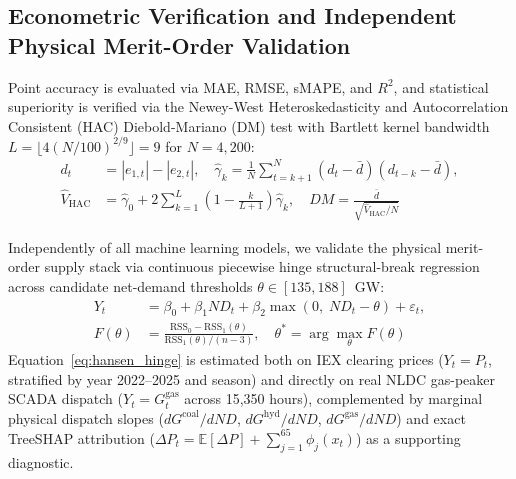 \documentclass[journal,10pt,twocolumn]{IEEEtran}
\begin{document}
\subsection{Econometric Verification and Independent Physical Merit-Order Validation}
Point accuracy is evaluated via MAE, RMSE, sMAPE, and $R^2$, and statistical superiority is verified via the Newey-West Heteroskedasticity and Autocorrelation Consistent (HAC) Diebold-Mariano (DM) test \cite{diebold1995comparing,newey1987simple} with Bartlett kernel bandwidth $L = \lfloor 4(N/100)^{2/9} \rfloor = 9$ for $N = 4,200$:
\begin{equation}
\begin{aligned}
d_t &= |e_{1,t}| - |e_{2,t}|, \quad \hat{\gamma}_k = \frac{1}{N}\sum_{t=k+1}^{N} (d_t - \bar{d})(d_{t-k} - \bar{d}), \\
\hat{V}_{\text{HAC}} &= \hat{\gamma}_0 + 2\sum_{k=1}^{L}\left(1 - \frac{k}{L+1}\right)\hat{\gamma}_k, \quad DM = \frac{\bar{d}}{\sqrt{\hat{V}_{\text{HAC}}/N}}
\end{aligned}
\label{eq:dm_hac}
\end{equation}

Independently of all machine learning models, we validate the physical merit-order supply stack via continuous piecewise hinge structural-break regression \cite{hansen2000sample} across candidate net-demand thresholds $\theta \in [135, 188]$~GW:
\begin{equation}
\begin{aligned}
Y_t &= \beta_0 + \beta_1 ND_t + \beta_2 \max(0, \; ND_t - \theta) + \varepsilon_t, \\
F(\theta) &= \frac{\text{RSS}_0 - \text{RSS}_1(\theta)}{\text{RSS}_1(\theta) / (n - 3)}, \quad \theta^* = \arg\max_{\theta} F(\theta)
\end{aligned}
\label{eq:hansen_hinge}
\end{equation}
Equation~\ref{eq:hansen_hinge} is estimated both on IEX clearing prices ($Y_t = P_t$, stratified by year 2022--2025 and season) and directly on real NLDC gas-peaker SCADA dispatch ($Y_t = G_t^{\text{gas}}$ across 15,350 hours), complemented by marginal physical dispatch slopes ($dG^{\text{coal}}/dND$, $dG^{\text{hyd}}/dND$, $dG^{\text{gas}}/dND$) and exact TreeSHAP attribution \cite{lundberg2020local} ($\Delta P_t = \mathbb{E}[\Delta P] + \sum_{j=1}^{65}\phi_j(x_t)$) as a supporting diagnostic.
\end{document}
